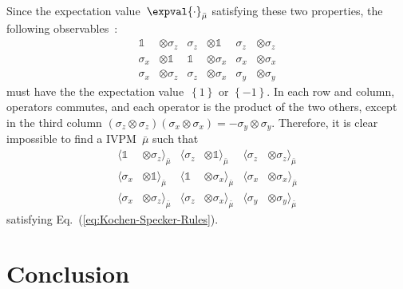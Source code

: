 \documentclass[english,reprint, aps, prl,superscriptaddress, showpacs,
showkeys, longbibliography, amsmath, amssymb]{revtex4-1}
\theoremstyle{plain}
\theoremstyle{definition}
\begin{document}
Since the expectation value~$\expval{\cdot}_{\bar{\mu}}$ satisfying
these two properties, the following observables~\cite{Mermin1990Simple,peres1995quantum}:
\begin{equation}
\begin{aligned}\mathbb{1} & \otimes\sigma_{z} & \sigma_{z} & \otimes\mathbb{1} & \sigma_{z} & \otimes\sigma_{z}\\
\sigma_{x} & \otimes\mathbb{1} & \mathbb{1} & \otimes\sigma_{x} & \sigma_{x} & \otimes\sigma_{x}\\
\sigma_{x} & \otimes\sigma_{z} & \sigma_{z} & \otimes\sigma_{x} & \sigma_{y} & \otimes\sigma_{y}
\end{aligned}
\label{eq:MerminSquare}
\end{equation}
must have the the expectation value~$\left\{ 1\right\} $ or $\left\{ -1\right\} $.
In each row and column, operators commutes, and each operator is the
product of the two others, except in the third column $\left(\sigma_{z}\otimes\sigma_{z}\right)\left(\sigma_{x}\otimes\sigma_{x}\right)=-\sigma_{y}\otimes\sigma_{y}$.
Therefore, it is clear impossible to find a IVPM~$\bar{\mu}$ such
that 
\begin{equation}
\begin{aligned}\langle\mathbb{1} & \otimes\sigma_{z}\rangle_{\bar{\mu}} & \langle\sigma_{z} & \otimes\mathbb{1}\rangle_{\bar{\mu}} & \langle\sigma_{z} & \otimes\sigma_{z}\rangle_{\bar{\mu}}\\
\langle\sigma_{x} & \otimes\mathbb{1}\rangle_{\bar{\mu}} & \langle\mathbb{1} & \otimes\sigma_{x}\rangle_{\bar{\mu}} & \langle\sigma_{x} & \otimes\sigma_{x}\rangle_{\bar{\mu}}\\
\langle\sigma_{x} & \otimes\sigma_{z}\rangle_{\bar{\mu}} & \langle\sigma_{z} & \otimes\sigma_{x}\rangle_{\bar{\mu}} & \langle\sigma_{y} & \otimes\sigma_{y}\rangle_{\bar{\mu}}
\end{aligned}
\label{eq:MerminSquare-values}
\end{equation}
satisfying Eq.~(\ref{eq:Kochen-Specker-Rules}).

\section{Conclusion}


\end{document}
